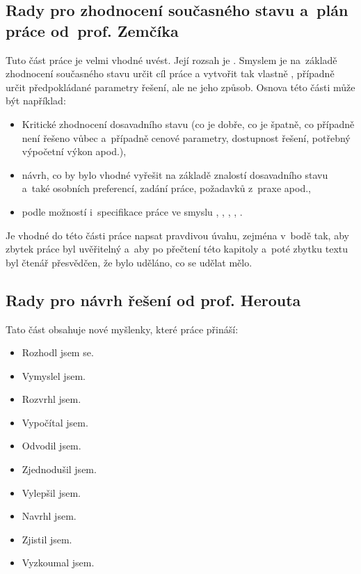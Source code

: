 \subsection*{Rady pro zhodnocení současného stavu a~plán práce od~prof. Zemčíka}

Tuto část práce je velmi vhodné uvést. Její rozsah je . Smyslem je na~základě zhodnocení současného stavu určit cíl práce a vytvořit tak vlastně , případně určit předpokládané parametry řešení, ale ne jeho způsob. Osnova této části může být například: 
\begin{itemize}
  \item{Kritické zhodnocení dosavadního stavu (co je dobře, co je špatně, co případně není řešeno vůbec a~případně cenové parametry, dostupnost řešení, potřebný výpočetní výkon apod.), }
  \item{návrh, co by bylo vhodné vyřešit na základě znalostí dosavadního stavu a~také osobních preferencí, zadání práce, požadavků z~praxe apod.,}
  \item{podle možností i~specifikace práce ve smyslu , , , , .}
\end{itemize}
Je vhodné do této části práce napsat pravdivou úvahu, zejména v~bodě  tak, aby zbytek práce byl uvěřitelný a~aby po přečtení této kapitoly a~poté zbytku textu byl čtenář přesvědčen, že bylo uděláno, co se udělat mělo.


\subsection*{Rady pro návrh řešení od prof. Herouta}

Tato část obsahuje nové myšlenky, které práce přináší:
\begin{itemize}
  \item{Rozhodl jsem se.}
  \item{Vymyslel jsem.}
  \item{Rozvrhl jsem.}
  \item{Vypočítal jsem.}
  \item{Odvodil jsem.}
  \item{Zjednodušil jsem.}
  \item{Vylepšil jsem.}
  \item{Navrhl jsem.}
  \item{Zjistil jsem.}
  \item{Vyzkoumal jsem.}
\end{itemize}

